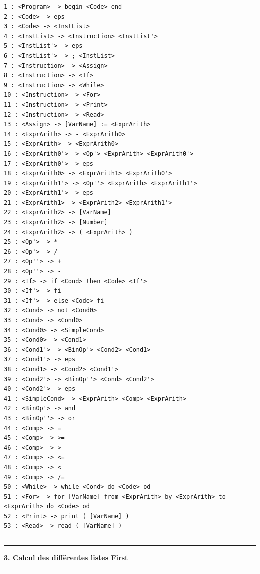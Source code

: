 \documentclass[pdftex,10pt,a4paper]{article}
\begin{document}
\begin{verbatim}
1 : <Program> -> begin <Code> end 
2 : <Code> -> eps 
3 : <Code> -> <InstList> 
4 : <InstList> -> <Instruction> <InstList'> 
5 : <InstList'> -> eps 
6 : <InstList'> -> ; <InstList> 
7 : <Instruction> -> <Assign> 
8 : <Instruction> -> <If> 
9 : <Instruction> -> <While> 
10 : <Instruction> -> <For> 
11 : <Instruction> -> <Print> 
12 : <Instruction> -> <Read> 
13 : <Assign> -> [VarName] := <ExprArith> 
14 : <ExprArith> -> - <ExprArith0> 
15 : <ExprArith> -> <ExprArith0> 
16 : <ExprArith0'> -> <Op'> <ExprArith> <ExprArith0'> 
17 : <ExprArith0'> -> eps 
18 : <ExprArith0> -> <ExprArith1> <ExprArith0'> 
19 : <ExprArith1'> -> <Op''> <ExprArith> <ExprArith1'> 
20 : <ExprArith1'> -> eps 
21 : <ExprArith1> -> <ExprArith2> <ExprArith1'> 
22 : <ExprArith2> -> [VarName] 
23 : <ExprArith2> -> [Number] 
24 : <ExprArith2> -> ( <ExprArith> ) 
25 : <Op'> -> * 
26 : <Op'> -> / 
27 : <Op''> -> + 
28 : <Op''> -> - 
29 : <If> -> if <Cond> then <Code> <If'> 
30 : <If'> -> fi 
31 : <If'> -> else <Code> fi 
32 : <Cond> -> not <Cond0> 
33 : <Cond> -> <Cond0> 
34 : <Cond0> -> <SimpleCond> 
35 : <Cond0> -> <Cond1> 
36 : <Cond1'> -> <BinOp'> <Cond2> <Cond1> 
37 : <Cond1'> -> eps 
38 : <Cond1> -> <Cond2> <Cond1'> 
39 : <Cond2'> -> <BinOp''> <Cond> <Cond2'> 
40 : <Cond2'> -> eps 
41 : <SimpleCond> -> <ExprArith> <Comp> <ExprArith> 
42 : <BinOp'> -> and 
43 : <BinOp''> -> or 
44 : <Comp> -> = 
45 : <Comp> -> >= 
46 : <Comp> -> > 
47 : <Comp> -> <= 
48 : <Comp> -> < 
49 : <Comp> -> /= 
50 : <While> -> while <Cond> do <Code> od 
51 : <For> -> for [VarName] from <ExprArith> by <ExprArith> to <ExprArith> do <Code> od 
52 : <Print> -> print ( [VarName] ) 
53 : <Read> -> read ( [VarName] ) 
\end{verbatim}
\noindent\rule[0.5ex]{\linewidth}{1pt}


\noindent\rule[0.5ex]{\linewidth}{1pt}
\textbf{3. Calcul des différentes listes First}\\
\noindent\rule[0.5ex]{\linewidth}{1pt}
\end{document}
